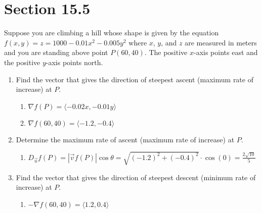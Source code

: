\documentclass[letter,11pt]{article}
\begin{document}
\section*{Section 15.5} 
Suppose you are climbing a hill whose shape is given by the equation $f(x,y) =z= 1000 - 0.01x^2 - 0.005y^2$ where $x$, $y$, and $z$ are measured in meters and you are standing above point $P(60, 40)$. The positive $x$-axis points east and the positive $y$-axis points north.
\begin{enumerate}[label = \Alph*.]
    \item Find the vector that gives the direction of steepest ascent (maximum rate of increase) at $P$.
        \begin{enumerate}[label=\roman*.]
            \item $\nabla f(P) = \langle -0.02 x, -0.01y \rangle$
            \item $\nabla f(60,40) = \langle -1.2, -0.4 \rangle$
        \end{enumerate}
    \item Determine the maximum rate of ascent (maximum rate of increase) at $P$.
        \begin{enumerate}[label=\roman*.]
            \item $D_{\vec{u}}f(P) =|\vec{v}f(P)|\cos \theta =\sqrt{(-1.2)^2+(-0.4)^2} \cdot \cos (0) = \frac{2\sqrt{10}}{5}$
        \end{enumerate}
    \item Find the vector that gives the direction of steepest descent (minimum rate of increase) at $P$. 
    \begin{enumerate}[label=\roman*.]
        \item $-\nabla f(60,40) = \langle 1.2, 0.4 \rangle$
    \end{enumerate}
\end{enumerate}
\end{document}
